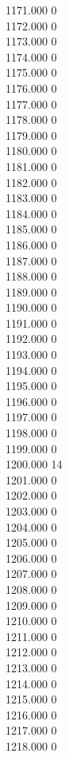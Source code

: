 { 1171.000	0 \\
 1172.000	0 \\
 1173.000	0 \\
 1174.000	0 \\
 1175.000	0 \\
 1176.000	0 \\
 1177.000	0 \\
 1178.000	0 \\
 1179.000	0 \\
 1180.000	0 \\
 1181.000	0 \\
 1182.000	0 \\
 1183.000	0 \\
 1184.000	0 \\
 1185.000	0 \\
 1186.000	0 \\
 1187.000	0 \\
 1188.000	0 \\
 1189.000	0 \\
 1190.000	0 \\
 1191.000	0 \\
 1192.000	0 \\
 1193.000	0 \\
 1194.000	0 \\
 1195.000	0 \\
 1196.000	0 \\
 1197.000	0 \\
 1198.000	0 \\
 1199.000	0 \\
 1200.000	14 \\
 1201.000	0 \\
 1202.000	0 \\
 1203.000	0 \\
 1204.000	0 \\
 1205.000	0 \\
 1206.000	0 \\
 1207.000	0 \\
 1208.000	0 \\
 1209.000	0 \\
 1210.000	0 \\
 1211.000	0 \\
 1212.000	0 \\
 1213.000	0 \\
 1214.000	0 \\
 1215.000	0 \\
 1216.000	0 \\
 1217.000	0 \\
 1218.000	0 \\
}
